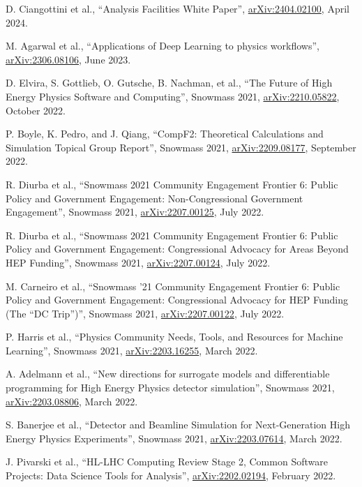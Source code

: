 \begin{nbdescription}[leftmargin=12pt,font=\normalfont,labelsep=0em]
\item D. Ciangottini et al., ``Analysis Facilities White Paper'', \href{https://arxiv.org/abs/2404.02100}{arXiv:2404.02100}, April 2024. %
\item M. Agarwal et al., ``Applications of Deep Learning to physics workflows'', \href{https://arxiv.org/abs/2306.08106}{arXiv:2306.08106}, June 2023. %
\item D. Elvira, S. Gottlieb, O. Gutsche, B. Nachman, et al., ``The Future of High Energy Physics Software and Computing'', Snowmass 2021, \href{https://arxiv.org/abs/2210.05822}{arXiv:2210.05822}, October 2022. %
\item P. Boyle, K. Pedro, and J. Qiang, ``CompF2: Theoretical Calculations and Simulation Topical Group Report'', Snowmass 2021, \href{https://arxiv.org/abs/2209.08177}{arXiv:2209.08177}, September 2022. %
\item R. Diurba et al., ``Snowmass 2021 Community Engagement Frontier 6: Public Policy and Government Engagement: Non-Congressional Government Engagement'', Snowmass 2021, \href{https://arxiv.org/abs/2207.00125}{arXiv:2207.00125}, July 2022. %
\item R. Diurba et al., ``Snowmass 2021 Community Engagement Frontier 6: Public Policy and Government Engagement: Congressional Advocacy for Areas Beyond HEP Funding'', Snowmass 2021, \href{https://arxiv.org/abs/2207.00124}{arXiv:2207.00124}, July 2022. %
\item M. Carneiro et al., ``Snowmass '21 Community Engagement Frontier 6: Public Policy and Government Engagement: Congressional Advocacy for HEP Funding (The ``DC Trip'')'', Snowmass 2021, \href{https://arxiv.org/abs/2207.00122}{arXiv:2207.00122}, July 2022. %
\item P. Harris et al., ``Physics Community Needs, Tools, and Resources for Machine Learning'', Snowmass 2021, \href{https://arxiv.org/abs/2203.16255}{arXiv:2203.16255}, March 2022. %
\item A. Adelmann et al., ``New directions for surrogate models and differentiable programming for High Energy Physics detector simulation'', Snowmass 2021, \href{https://arxiv.org/abs/2203.08806}{arXiv:2203.08806}, March 2022. %
\item S. Banerjee et al., ``Detector and Beamline Simulation for Next-Generation High Energy Physics Experiments'', Snowmass 2021, \href{https://arxiv.org/abs/2203.07614}{arXiv:2203.07614}, March 2022. %
\item J. Pivarski et al., ``HL-LHC Computing Review Stage 2, Common Software Projects: Data Science Tools for Analysis'', \href{https://arxiv.org/abs/2202.02194}{arXiv:2202.02194}, February 2022. %

\end{nbdescription}
